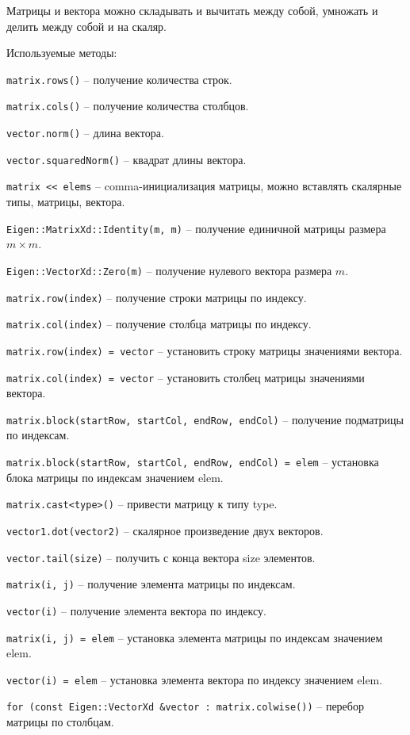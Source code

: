 Матрицы и вектора можно складывать и вычитать между собой, умножать и делить между собой и на скаляр. 

Используемые методы:

\verb!matrix.rows()! -- получение количества строк.

\verb!matrix.cols()! -- получение количества столбцов.

\verb!vector.norm()! -- длина вектора.

\verb!vector.squaredNorm()! -- квадрат длины вектора.

\verb!matrix << elems! -- comma-инициализация матрицы, можно вставлять скалярные типы, матрицы, вектора.

\verb!Eigen::MatrixXd::Identity(m, m)! -- получение единичной матрицы размера $ m \times m $.

\verb!Eigen::VectorXd::Zero(m)! -- получение нулевого вектора размера $ m $.

\verb!matrix.row(index)! -- получение строки матрицы по индексу.

\verb!matrix.col(index)! -- получение столбца матрицы по индексу.

\verb!matrix.row(index) = vector! -- установить строку матрицы значениями вектора.

\verb!matrix.col(index) = vector! -- установить столбец матрицы значениями вектора.

\verb!matrix.block(startRow, startCol, endRow, endCol)! -- получение подматрицы по индексам.

\verb!matrix.block(startRow, startCol, endRow, endCol) = elem! -- установка блока матрицы по индексам значением elem.

\verb!matrix.cast<type>()! -- привести матрицу к типу type.

\verb!vector1.dot(vector2)! -- скалярное произведение двух векторов.

\verb!vector.tail(size)! -- получить с конца вектора size элементов.

\verb!matrix(i, j)! -- получение элемента матрицы по индексам.

\verb!vector(i)! -- получение элемента вектора по индексу.

\verb!matrix(i, j) = elem! -- установка элемента матрицы по индексам значением elem.

\verb!vector(i) = elem! -- установка элемента вектора по индексу значением elem.

\verb!for (const Eigen::VectorXd &vector : matrix.colwise())! -- перебор матрицы по столбцам.

